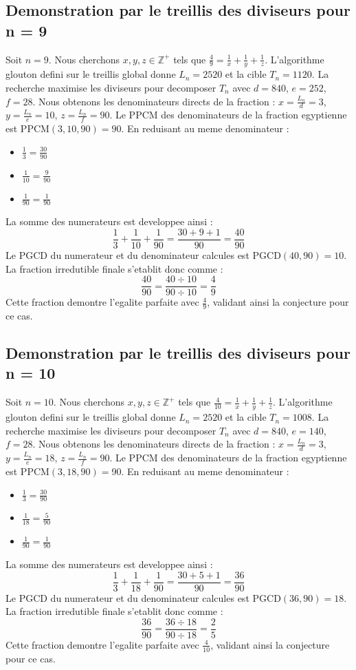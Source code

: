 \documentclass[11pt,a4paper]{article}
\begin{document}
\subsection{Demonstration par le treillis des diviseurs pour n = 9}
Soit $n = 9$. Nous cherchons $x, y, z \in \mathbb{Z}^{+}$ tels que $\frac{4}{9} = \frac{1}{x} + \frac{1}{y} + \frac{1}{z}$.
L'algorithme glouton defini sur le treillis global donne $L_n = 2520$ et la cible $T_n = 1120$.
La recherche maximise les diviseurs pour decomposer $T_n$ avec $d = 840$, $e = 252$, $f = 28$.
Nous obtenons les denominateurs directs de la fraction : $x = \frac{L_n}{d} = 3$, $y = \frac{L_n}{e} = 10$, $z = \frac{L_n}{f} = 90$.
Le PPCM des denominateurs de la fraction egyptienne est $\text{PPCM}(3, 10, 90) = 90$.
En reduisant au meme denominateur :
\begin{itemize}
    \item $\frac{1}{3} = \frac{30}{90}$
    \item $\frac{1}{10} = \frac{9}{90}$
    \item $\frac{1}{90} = \frac{1}{90}$
\end{itemize}
La somme des numerateurs est developpee ainsi :
$$ \frac{1}{3} + \frac{1}{10} + \frac{1}{90} = \frac{30 + 9 + 1}{90} = \frac{40}{90} $$
Le PGCD du numerateur et du denominateur calcules est $\text{PGCD}(40, 90) = 10$.
La fraction irredutible finale s'etablit donc comme :
$$ \frac{40}{90} = \frac{40 \div 10}{90 \div 10} = \frac{4}{9} $$
Cette fraction demontre l'egalite parfaite avec $\frac{4}{9}$, validant ainsi la conjecture pour ce cas.

\subsection{Demonstration par le treillis des diviseurs pour n = 10}
Soit $n = 10$. Nous cherchons $x, y, z \in \mathbb{Z}^{+}$ tels que $\frac{4}{10} = \frac{1}{x} + \frac{1}{y} + \frac{1}{z}$.
L'algorithme glouton defini sur le treillis global donne $L_n = 2520$ et la cible $T_n = 1008$.
La recherche maximise les diviseurs pour decomposer $T_n$ avec $d = 840$, $e = 140$, $f = 28$.
Nous obtenons les denominateurs directs de la fraction : $x = \frac{L_n}{d} = 3$, $y = \frac{L_n}{e} = 18$, $z = \frac{L_n}{f} = 90$.
Le PPCM des denominateurs de la fraction egyptienne est $\text{PPCM}(3, 18, 90) = 90$.
En reduisant au meme denominateur :
\begin{itemize}
    \item $\frac{1}{3} = \frac{30}{90}$
    \item $\frac{1}{18} = \frac{5}{90}$
    \item $\frac{1}{90} = \frac{1}{90}$
\end{itemize}
La somme des numerateurs est developpee ainsi :
$$ \frac{1}{3} + \frac{1}{18} + \frac{1}{90} = \frac{30 + 5 + 1}{90} = \frac{36}{90} $$
Le PGCD du numerateur et du denominateur calcules est $\text{PGCD}(36, 90) = 18$.
La fraction irredutible finale s'etablit donc comme :
$$ \frac{36}{90} = \frac{36 \div 18}{90 \div 18} = \frac{2}{5} $$
Cette fraction demontre l'egalite parfaite avec $\frac{4}{10}$, validant ainsi la conjecture pour ce cas.
\end{document}
